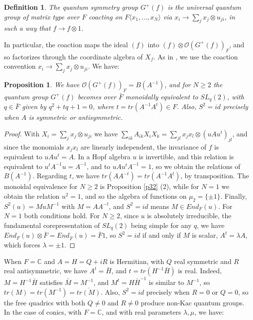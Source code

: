\documentclass[11pt]{amsart}
\newtheorem{proposition}[theorem]{Proposition}
\newtheorem{definition}[theorem]{Definition}
\theoremstyle{definition}
\begin{document}
\begin{definition}
The quantum symmetry group $G^+(f)$ is the universal quantum group of matrix type over $F$ coacting on $F\langle x_1,\ldots,x_N\rangle$ via $x_i\to\sum_jx_j\otimes u_{ji}$, in such a way that $f\to f\otimes1$.
\end{definition}

In particular, the coaction maps the ideal $(f)$ into $(f)\otimes\mathcal O(G^+(f))_F$, and so factorizes through the coordinate algebra of $X_f$. As in \cite{fba}, we use the coaction convention $x_i\to\sum_jx_j\otimes u_{ji}$. We have:

\begin{proposition}
\label{p42}
We have $\mathcal O(G^+(f))_F=B(A^{-1})$, and for $N\geq2$ the quantum group $G^+(f)$ becomes over $\bar F$ monoidally equivalent to $SL_q(2)$, with $q\in\bar F$ given by $q^2+tq+1=0$, where $t=tr(A^{-1}A^t)\in F$. Also, $S^2=id$ precisely when $A$ is symmetric or antisymmetric.
\end{proposition}

\begin{proof}
With $X_i=\sum_jx_j\otimes u_{ji}$ we have $\sum_{ik}A_{ik}X_iX_k=\sum_{jl}x_jx_l\otimes(uAu^t)_{jl}$, and since the monomials $x_jx_l$ are linearly independent, the invariance of $f$ is equivalent to $uAu^t=A$. In a Hopf algebra $u$ is invertible, and this relation is equivalent to $u^tA^{-1}u=A^{-1}$, and to $uAu^tA^{-1}=1$, so we obtain the relations of $B(A^{-1})$. Regarding $t$, we have $tr(AA^{-t})=tr(A^{-1}A^t)$, by transposition. The monoidal equivalence for $N\geq2$ is Proposition \ref{p32} (2), while for $N=1$ we obtain the relation $u^2=1$, and so the algebra of functions on $\mu_2=\{\pm1\}$. Finally, $S^2(u)=MuM^{-1}$ with $M=AA^{-t}$, and $S^2=id$ means $M\in End_F(u)$. For $N=1$ both conditions hold. For $N\geq2$, since $u$ is absolutely irreducible, the fundamental corepresentation of $SL_q(2)$ being simple for any $q$, we have $End_F(u)\otimes\bar F=End_{\bar F}(u)=\bar F1$, so $S^2=id$ if and only if $M$ is scalar, $A^t=\lambda A$, which forces $\lambda=\pm1$.
\end{proof}

When $F=\mathbb C$ and $A=H=Q+iR$ is Hermitian, with $Q$ real symmetric and $R$ real antisymmetric, we have $A^t=\bar H$, and $t=tr(H^{-1}\bar H)$ is real. Indeed, $M=H^{-1}\bar H$ satisfies $\bar M=M^{-1}$, and $M^t=H\bar H^{-1}$ is similar to $M^{-1}$, so $tr(M)=tr(M^{-1})=\overline{tr(M)}$. Also, $S^2=id$ precisely when $R=0$ or $Q=0$, so the free quadrics with both $Q\neq0$ and $R\neq0$ produce non-Kac quantum groups. In the case of conics, with $F=\mathbb C$, and with real parameters $\lambda,\mu$, we have:
\end{document}
